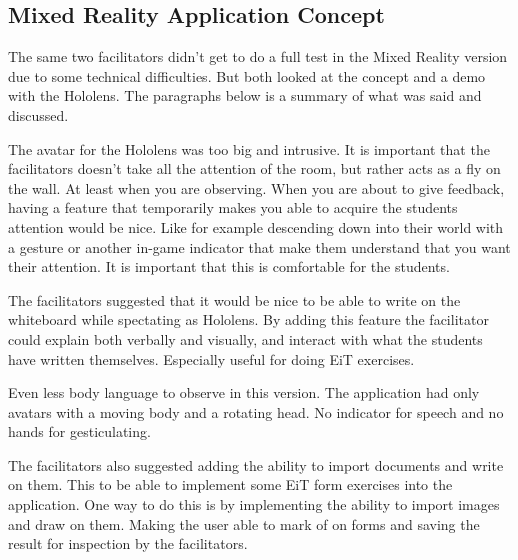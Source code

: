         
        
        
        
        
        
        \subsection{Mixed Reality Application Concept} %
        The same two facilitators didn't get to do a full test in the Mixed Reality version due to some technical difficulties. But both looked at the concept and a demo with the Hololens. The paragraphs below is a summary of what was said and discussed.
        
        The avatar for the Hololens was too big and intrusive. It is important that the facilitators doesn't take all the attention of the room, but rather acts as a fly on the wall. At least when you are observing. When you are about to give feedback, having a feature that temporarily makes you able to acquire the students attention would be nice. Like for example descending down into their world with a gesture or another in-game indicator that make them understand that you want their attention. It is important that this is comfortable for the students.
        
        The facilitators suggested that it would be nice to be able to write on the whiteboard while spectating as Hololens. By adding this feature the facilitator could explain both verbally and visually, and interact with what the students have written themselves. Especially useful for doing EiT exercises.
        
        Even less body language to observe in this version. The application had only avatars with a moving body and a rotating head. No indicator for speech and no hands for gesticulating.
        
        The facilitators also suggested adding the ability to import documents and write on them. This to be able to implement some EiT form exercises into the application. One way to do this is by implementing the ability to import images and draw on them. Making the user able to mark of on forms and saving the result for inspection by the facilitators.
        
